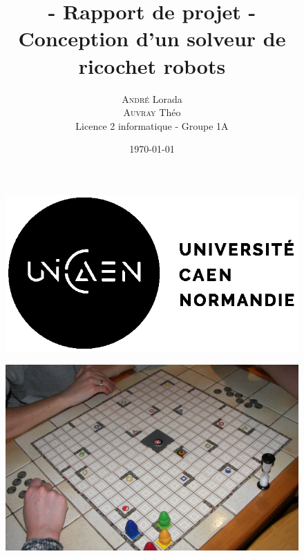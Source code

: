 \documentclass[a4paper, 12pt]{article}
\title{- Rapport de projet - \\ Conception d'un solveur de ricochet robots}
\author{
    \textsc{André} Lorada \\
    \textsc{Auvray} Théo \\
    Licence 2 informatique - Groupe 1A
}
\date \today
\begin{document}
\begin{figure}[t]
    \includegraphics[scale=1]{images/logo.png}
\end{figure}

\maketitle

\begin{figure}[H]
    \centering
    \includegraphics[scale=0.5]{images/ricochetrobot.jpg}
\end{figure}

\newpage %

\tableofcontents

\newpage %
\end{document}
